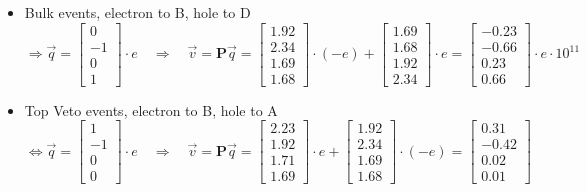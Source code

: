 \begin{itemize}
	\item Bulk events, electron to B, hole to D \begin{equation}
	\Rightarrow \vec{q} =
	\begin{bmatrix}
	0 \\ -1 \\ 0 \\ 1
	\end{bmatrix}
	\cdot e
	\quad \Rightarrow \quad
	\vec{v} = \bm{P} \vec{q} =
	\begin{bmatrix}
	1.92 \\ 2.34 \\ 1.69 \\ 1.68
	\end{bmatrix}
	\cdot (-e)
	+ 
	\begin{bmatrix}
	1.69 \\ 1.68 \\ 1.92 \\ 2.34
	\end{bmatrix}
	\cdot e
	= 
	\begin{bmatrix}
	-0.23 \\ -0.66 \\ 0.23 \\ 0.66
	\end{bmatrix}
	\cdot e \cdot 10^{11}
	\end{equation}
	\item Top Veto events, electron to B, hole to A \begin{equation}
	\Leftrightarrow \vec{q} =
	\begin{bmatrix}
	1 \\ -1 \\ 0 \\ 0
	\end{bmatrix}
	\cdot e
	\quad \Rightarrow \quad
	\vec{v} = \bm{P} \vec{q} =
	\begin{bmatrix}
	2.23 \\ 1.92 \\ 1.71 \\ 1.69
	\end{bmatrix}
	\cdot e
	+
	\begin{bmatrix}
	1.92 \\ 2.34 \\ 1.69 \\ 1.68
	\end{bmatrix}
	\cdot (-e)
	= 
	\begin{bmatrix}
	0.31 \\ -0.42 \\ 0.02 \\ 0.01

\end{bmatrix}
\end{equation}
\end{itemize}
